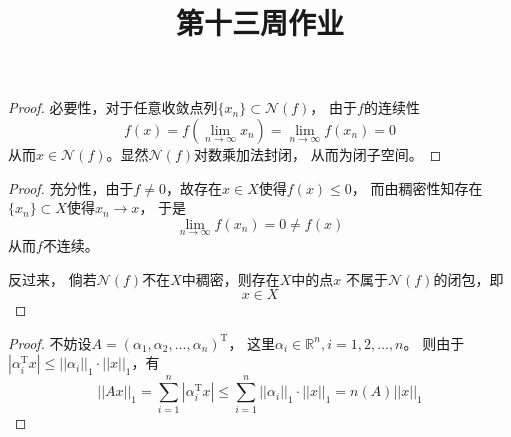 \documentclass[cn]{homework}
\title{第十三周作业}
\begin{document}
    \maketitle
    
    \problem
    \begin{subproblem}[(\arabic*)]
        \item
        \begin{proof}
            必要性，对于任意收敛点列$\{x_n\}\subset\mathcal N(f)$，
            由于$f$的连续性
            \[f(x)=f(\lim_{n\to\infty}x_n)=\lim_{n\to\infty}f(x_n)=0\]
            从而$x\in\mathcal N(f)$。显然$\mathcal N(f)$对数乘加法封闭，
            从而为闭子空间。
            
        \end{proof}

        \item
        \begin{proof}
            充分性，由于$f\neq 0$，故存在$x\in X$使得$f(x)\leq 0$，
            而由稠密性知存在$\{x_n\}\subset X$使得$x_n\to x$，
            于是
            \[\lim_{n\to\infty}f(x_n)=0\neq f(x)\]
            从而$f$不连续。

            反过来，
            倘若$\mathcal N(f)$不在$X$中稠密，则存在$X$中的点$x$
            不属于$\mathcal N(f)$的闭包，即
            \[x\in X\]
        \end{proof}
    \end{subproblem}

    \problem
    \begin{subproblem}[(\arabic*)]
        \item
        \begin{proof}
            不妨设$A=(\alpha_1,\alpha_2,\ldots,\alpha_n)^\mathrm{T}$，
            这里$\alpha_i\in\mathbb R^n,i=1,2,\ldots,n$。
            则由于$|\alpha_i^\mathrm Tx|\leq||\alpha_i||_1\cdot||x||_1$，有
            \[||Ax||_1=\sum_{i=1}^n|\alpha_i^\mathrm{T}x|
            \leq\sum_{i=1}^n||\alpha_i||_1\cdot||x||_1
            =n(A)||x||_1\]
        \end{proof}

        \item
    \end{subproblem}
\end{document}

